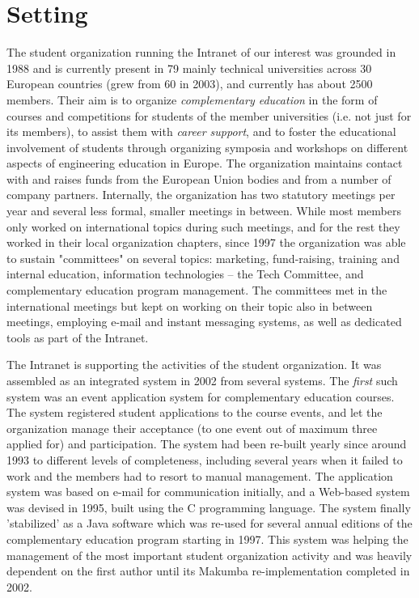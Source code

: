 \documentclass{acm_proc_article-sp}
\begin{document}

\section{Setting}\label{sec:setting}
The student organization running the Intranet of our interest was grounded in 1988 and is currently present in 79 mainly technical universities across 30 European countries (grew from 60 in 2003), and currently has about 2500 members. Their aim is to organize {\it complementary education} in the form of courses and competitions for students of the member universities (i.e. not just for its members), to assist them with {\it career support}, and to foster the educational involvement of students through organizing symposia and workshops on different aspects of engineering education in Europe.
The organization maintains contact with and raises funds from the European Union bodies and from a number of company partners. Internally, the organization has two statutory meetings per year and several less formal, smaller meetings in between. While most members only worked on international topics during such meetings, and for the rest they worked in their local organization chapters, since 1997 the organization was able to sustain "committees" on several topics: marketing, fund-raising, training and internal education, information technologies -- the Tech Committee, and complementary education program management. The committees met in the international meetings but kept on working on their topic also in between meetings, employing e-mail and instant messaging systems, as well as dedicated tools as part of the Intranet.

The Intranet is supporting the activities of the student organization. It was assembled as an integrated system in 2002 from several systems. The {\it first} such system was an event application system for complementary education courses. The system registered student applications to the course events, and let the organization manage their acceptance (to one event out of maximum three applied for) and participation. The system had been re-built yearly since around 1993 to different levels of completeness, including several years when it failed to work and the members had to resort to manual management. The application system was based on e-mail for communication initially, and a Web-based system was devised in 1995, built using the C programming language. The system finally 'stabilized' as a Java software which was re-used for several annual editions of the complementary education program starting in 1997. This system was helping the management of the most important student organization activity and was heavily dependent on the first author until its Makumba re-implementation completed in 2002.
\end{document}
